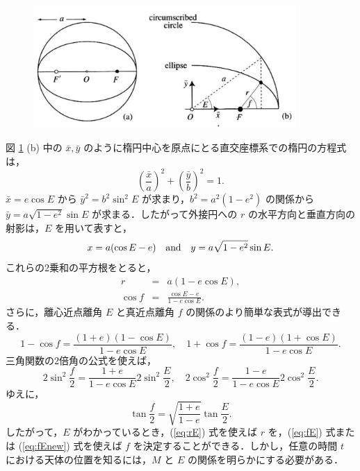 \documentclass[11pt,a4paper,oneside,onecolumn]{jarticle}
\begin{document}
\begin{figure}[H]
\centering
\includegraphics[width=10cm]{./image/sec2_7.pdf}
\caption{\label{fig:Ef}}
\end{figure}

図 \ref{fig:Ef} (b) 中の $\bar{x}, \bar{y}$ のように楕円中心を原点にとる直交座標系での楕円の方程式は，
\begin{equation}
\left( \frac{\bar{x}}{a} \right)^2 + \left( \frac{\bar{y}}{b} \right)^2 = 1.
\end{equation}
$\bar{x} = e \cos E$ から $\bar{y}^2 = b^2 \sin^2 E$ が求まり，$b^2 = a^2 (1 - e^2)$ の関係から $\bar{y} = a \sqrt{1 - e^2} \sin E$ が求まる．したがって外接円への $r$ の水平方向と垂直方向の射影は，$E$ を用いて表すと，
\begin{equation}
x = a (\cos E - e) \quad {\rm and} \quad y = a \sqrt{1 - e^2} \sin E. \label{eq:xEyE}
\end{equation}
これらの2乗和の平方根をとると，
\begin{eqnarray}
r & = & a (1 - e \cos E), \label{eq:rE} \\
\cos f & = & \frac{\cos E - e}{1 - e \cos E}. \label{eq:fE}
\end{eqnarray}
さらに，離心近点離角 $E$ と真近点離角 $f$ の関係のより簡単な表式が導出できる．
\begin{equation}
1 - \cos f = \frac{(1 + e) (1 - \cos E)}{1 - e \cos E}, \quad 1 + \cos f = \frac{(1 - e) (1 + \cos E)}{1 - e \cos E}.
\end{equation}
三角関数の2倍角の公式を使えば，
\begin{equation}
2 \sin^2 \frac{f}{2} = \frac{1 + e}{1 - e \cos E} 2 \sin^2 \frac{E}{2}, \quad 2 \cos^2 \frac{f}{2} = \frac{1 - e}{1 - e \cos E} 2 \cos^2 \frac{E}{2}.
\end{equation}
ゆえに，
\begin{equation}
\tan \frac{f}{2} = \sqrt{\frac{1 + e}{1 - e}} \tan \frac{E}{2}. \label{eq:fEnew}
\end{equation}
したがって，$E$ がわかっているとき，(\ref{eq:rE}) 式を使えば $r$ を，(\ref{eq:fE}) 式または (\ref{eq:fEnew}) 式を使えば $f$ を決定することができる．しかし，任意の時間 $t$ における天体の位置を知るには，$M$ と $E$ の関係を明らかにする必要がある．
\end{document}
